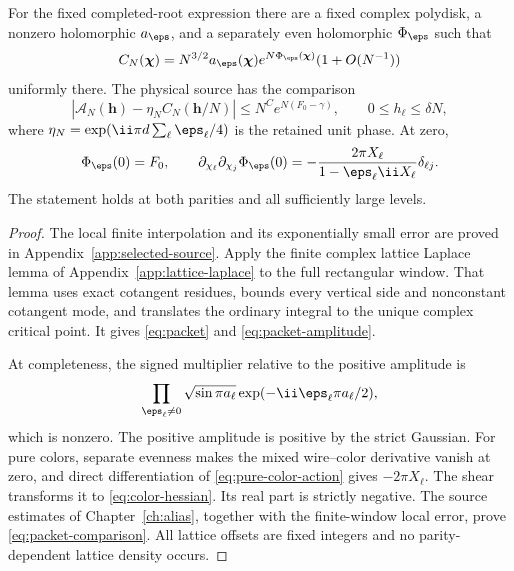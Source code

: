 \begin{theorem}\label{thm:packet}
For the fixed completed-root expression there are a fixed complex polydisk, a nonzero holomorphic $a_\eps$, and a separately even holomorphic $\Phi_\eps$ such that
\begin{equation}\label{eq:packet}
 C_N(\boldsymbol\chi)=N^{3/2}a_\eps(\boldsymbol\chi)
 e^{N\Phi_\eps(\boldsymbol\chi)}(1+O(N^{-1}))
\end{equation}
uniformly there. The physical source has the comparison
\begin{equation}\label{eq:packet-comparison}
 |\mathcal A_N(\mathbf h)-\eta_N C_N(\mathbf h/N)|
 \le N^C e^{N(F_0-\gamma)},\qquad 0\le h_\ell\le\delta N,
\end{equation}
where $\eta_N=\exp(\ii\pi d\sum_\ell\eps_\ell/4)$ is the retained unit phase. At zero,
\begin{equation}\label{eq:color-hessian}
 \Phi_\eps(0)=F_0,\qquad
 \partial_{\chi_\ell}\partial_{\chi_j}\Phi_\eps(0)
 =-\frac{2\pi X_\ell}{1-\eps_\ell\ii X_\ell}\delta_{\ell j}.
\end{equation}
The statement holds at both parities and all sufficiently large levels.
\end{theorem}
\begin{proof}
The local finite interpolation and its exponentially small error are proved in Appendix~\ref{app:selected-source}. Apply the finite complex lattice Laplace lemma of Appendix~\ref{app:lattice-laplace} to the full rectangular window. That lemma uses exact cotangent residues, bounds every vertical side and nonconstant cotangent mode, and translates the ordinary integral to the unique complex critical point. It gives \eqref{eq:packet} and \eqref{eq:packet-amplitude}.

At completeness, the signed multiplier relative to the positive amplitude is
\[
 \prod_{\eps_\ell\ne0}\sqrt{\sin\pi a_\ell}
 \exp(-\ii\eps_\ell\pi a_\ell/2),
\]
which is nonzero. The positive amplitude is positive by the strict Gaussian. For pure colors, separate evenness makes the mixed wire--color derivative vanish at zero, and direct differentiation of \eqref{eq:pure-color-action} gives $-2\pi X_\ell$. The shear transforms it to \eqref{eq:color-hessian}. Its real part is strictly negative. The source estimates of Chapter~\ref{ch:alias}, together with the finite-window local error, prove \eqref{eq:packet-comparison}. All lattice offsets are fixed integers and no parity-dependent lattice density occurs.
\end{proof}

